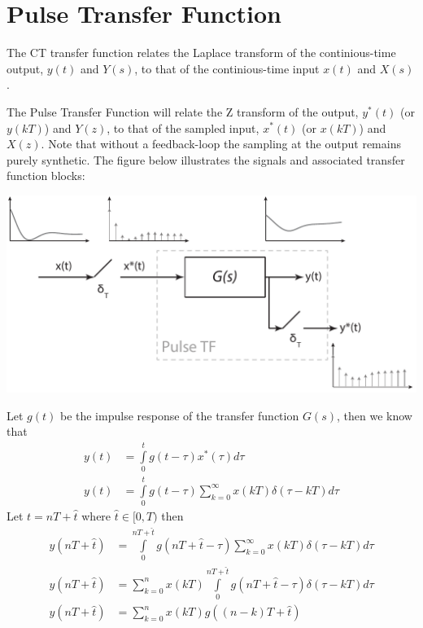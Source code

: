 \documentclass[twoside]{article}
\begin{document}
\section*{Pulse Transfer Function}

The CT transfer function relates the Laplace transform of the
continious-time output, $y(t)$ and $Y(s)$, to that of the
continious-time input $x(t)$ and $X(s)$. 

The Pulse Transfer Function will relate the Z transform of the
output, $y^*(t)$ (or $y(kT)$) and $Y(z)$, to that of the sampled
input, $x^*(t)$ (or $x(kT)$) and $X(z)$. Note that without a 
feedback-loop the sampling at the output remains purely 
synthetic. The figure below illustrates the signals and associated 
transfer function blocks:
%
    \begin{center}
\begin{minipage}[h]{0.9\linewidth}
    \begin{center}
      \includegraphics[width=\textwidth]{pulse}
    \end{center}
\end{minipage}
    \end{center}
%
Let $g(t)$ be the impulse response of the transfer function $G(s)$,
then we know that
%
\begin{align*}
  y(t) &= \int\limits_0^t g(t-\tau) x^*(\tau) d\tau 
\\
y(t) &=  \int\limits_0^t g(t-\tau) \sum\limits_{k=0}^{\infty} x(kT)
       \delta(\tau-kT) d\tau 
\end{align*}
%
Let $t = n T + \hat{t}$ where $\hat{t} \in [0,T)$ then
%
\begin{align*}
y(n T + \hat{t}) &=  \int\limits_0^{n T + \hat{t}} g(n T + \hat{t} - \tau) \sum\limits_{k=0}^{\infty} x(kT)
       \delta(\tau-kT) d\tau 
\\
y(n T + \hat{t}) &= \sum\limits_{k=0}^{n} x(kT) \int\limits_0^{n T +
                   \hat{t}} g(n T + \hat{t} -\tau) \delta(\tau-kT)
                   d\tau 
\\
y(n T + \hat{t}) &= \sum\limits_{k=0}^{n} x(kT) g( (n-k) T + \hat{t}) 
\end{align*}
\end{document}
